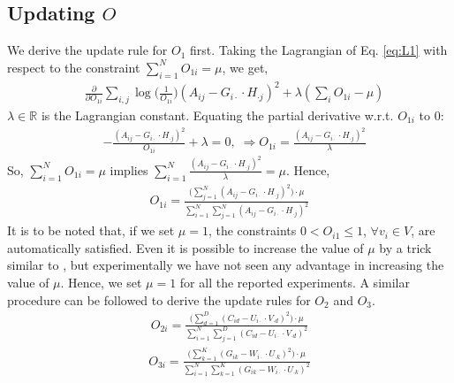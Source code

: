 \documentclass[letterpaper]{article} %
\begin{document}
\subsection{Updating $O$}
We derive the update rule for $O_1$ first. Taking the Lagrangian of Eq. \ref{eq:L1} with respect to the constraint $\sum\limits_{i=1}^N O_{1i} = \mu$, we get,
\begin{align}
& \frac{\partial }{\partial O_{1i}} \sum\limits_{i,j}\log\Big({\frac{1}{O_{1i}}}\Big) (A_{ij} - G_{i\cdot} \cdot H_{\cdot j})^2 + \lambda(\sum\limits_{i} O_{1i} - \mu) \nonumber  
\end{align}
$\lambda \in \mathbb{R}$ is the Lagrangian constant. Equating the partial derivative w.r.t. $O_{1i}$ to 0:
\begin{align*}
&-\frac{(A_{ij} - G_{i\cdot} \cdot H_{\cdot j})^2}{O_{1i}} + \lambda = 0, \;
\Rightarrow O_{1i} = \frac{(A_{ij} - G_{i\cdot} \cdot H_{\cdot j})^2}{\lambda}
\end{align*}
So, $\sum\limits_{i=1}^N O_{1i} = \mu$ implies $\sum\limits_{i=1}^N \frac{(A_{ij} - G_{i\cdot} \cdot H_{\cdot j})^2}{\lambda} = \mu$. Hence,
\begin{align}\label{eq:O1}
\boxed{
O_{1i} = \frac{
\Big(\sum_{j=1}^N(A_{ij} - G_{i\cdot}\cdot H_{\cdot j})^2 \Big) \cdot \mu
}
{
\sum_{i=1}^N\sum_{j=1}^N(A_{ij} - G_{i\cdot}\cdot H_{\cdot j})^{2}
}
}
\end{align}
It is to be noted that, if we set $\mu = 1$, the constraints $0 < O_{i1} \leq 1$, $\forall v_i \in V$, are automatically satisfied. Even it is possible to increase the value of $\mu$ by a trick similar to \cite{gupta2012integrating}, but experimentally we have not seen any advantage in increasing the value of $\mu$. Hence, we set $\mu = 1$ for all the reported experiments. A similar procedure can be followed to derive the update rules for $O_2$ and $O_3$.
\begin{align}\label{eq:O2}
\boxed{
O_{2i} = \frac{
\Big(\sum_{d=1}^D(C_{id} - U_{i\cdot}\cdot V_{\cdot d})^2 \Big) \cdot \mu
}
{
\sum_{i=1}^N\sum_{j=1}^D(C_{id} - U_{i\cdot}\cdot V_{\cdot d})^{2}
}
}
\end{align}
\begin{align}\label{eq:O3}
\boxed{
O_{3i} = \frac{
\Big( \sum_{k=1}^K(G_{ik} - W_{i\cdot}\cdot U_{\cdot k})^2 \Big) \cdot \mu
}
{
\sum_{i=1}^N\sum_{k=1}^K(G_{ik} - W_{i\cdot}\cdot U_{\cdot k})^2
}
}
\end{align}
\end{document}
